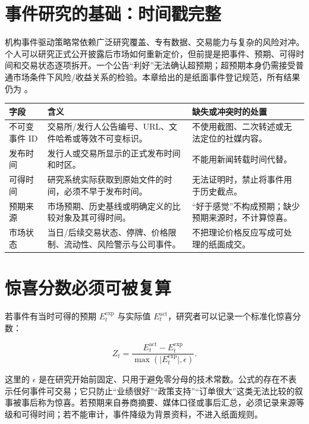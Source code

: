 \section{事件研究的基础：时间戳完整}

机构事件驱动策略常依赖广泛研究覆盖、专有数据、交易能力与复杂的风险对冲。个人可以研究正式公开披露后市场如何重新定价，但前提是把事件、预期、可得时间和交易状态逐项拆开。一个公告“利好”无法确认超预期；超预期本身仍需接受普通市场条件下风险/收益关系的检验。本章给出的是纸面事件登记规范，所有结果仍为 \qzero{}。

\begin{exhibitbox}
\small
\begin{tabularx}{\exhibitboxwidth}{L{2.55cm}X L{3.95cm}}
\toprule
\textbf{字段} & \textbf{含义} & \textbf{缺失或冲突时的处置} \\
\midrule
不可变事件 ID & 交易所/发行人公告编号、URL、文件哈希或等效不可变标识。 & 不使用截图、二次转述或无法定位的社媒内容。 \\
发布时间 & 发行人或交易所显示的正式发布时间和时区。 & 不能用新闻转载时间代替。 \\
可得时间 & 研究系统实际获取到原始文件的时间，必须不早于发布时间。 & 无法证明时，禁止将事件用于历史截点。 \\
预期来源 & 市场预期、历史基线或明确定义的比较对象及其可得时间。 & “好于感觉”不构成预期；缺少预期来源时，不计算惊喜。 \\
市场状态 & 当日/后续交易状态、停牌、价格限制、流动性、风险警示与公司事件。 & 不把理论价格反应写成可处理的纸面成交。 \\
\bottomrule
\end{tabularx}
\end{exhibitbox}

\section{惊喜分数必须可被复算}

若事件有当时可得的预期 \(E^{\mathrm{exp}}_t\) 与实际值 \(E^{\mathrm{act}}_t\)，研究者可以记录一个标准化惊喜分数：

\[
Z_t=\frac{E^{\mathrm{act}}_t-E^{\mathrm{exp}}_t}
{\max\left(\vert E^{\mathrm{exp}}_t\vert,\epsilon\right)}.
\]

这里的 \(\epsilon\) 是在研究开始前固定、只用于避免零分母的技术常数。公式的存在不表示任何事件可交易；它只防止“业绩很好”“政策支持”“订单很大”这类无法比较的叙事被事后称为惊喜。若预期来自券商摘要、媒体口径或事后汇总，必须记录来源等级和可得时间；若不能审计，事件降级为背景资料，不进入纸面规则。

